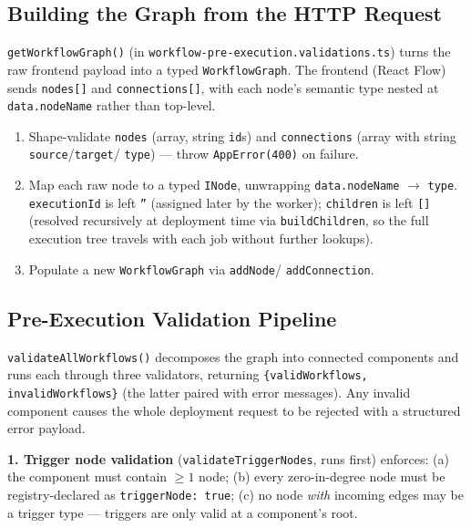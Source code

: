 \subsection{Building the Graph from the HTTP Request}

\texttt{getWorkflowGraph()} (in \texttt{workflow-pre-execution.validations.ts})
turns the raw frontend payload into a typed \texttt{WorkflowGraph}. The
frontend (React Flow) sends \texttt{nodes[]} and \texttt{connections[]}, with
each node's semantic type nested at \texttt{data.nodeName} rather than
top-level.

\begin{enumerate}
  \item Shape-validate \texttt{nodes} (array, string \texttt{id}s) and
        \texttt{connections} (array with string \texttt{source}/\texttt{target}/
        \texttt{type}) --- throw \texttt{AppError(400)} on failure.
  \item Map each raw node to a typed \texttt{INode}, unwrapping
        \texttt{data.nodeName} $\rightarrow$ \texttt{type}. \texttt{executionId}
        is left \texttt{''} (assigned later by the worker); \texttt{children}
        is left \texttt{[]} (resolved recursively at deployment time via
        \texttt{buildChildren}, so the full execution tree travels with each
        job without further lookups).
  \item Populate a new \texttt{WorkflowGraph} via \texttt{addNode}/
        \texttt{addConnection}.
\end{enumerate}

\subsection{Pre-Execution Validation Pipeline}

\texttt{validateAllWorkflows()} decomposes the graph into connected components
and runs each through three validators, returning
\texttt{\{validWorkflows, invalidWorkflows\}} (the latter paired with error
messages). Any invalid component causes the whole deployment request to be
rejected with a structured error payload.

\textbf{1. Trigger node validation} (\texttt{validateTriggerNodes}, runs
first) enforces: (a) the component must contain $\geq 1$ node; (b) every
zero-in-degree node must be registry-declared as \texttt{triggerNode: true};
(c) no node \textit{with} incoming edges may be a trigger type --- triggers
are only valid at a component's root.


